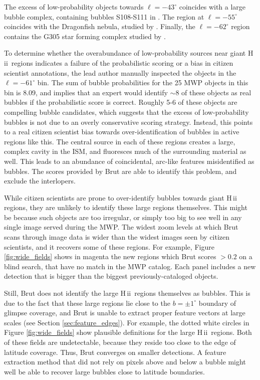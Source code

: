 \documentclass[preprint]{aastex}
\newcommand{\hii}[0]{{\sc H\,ii}}
\begin{document}
The excess of low-probability objects towards $\ell=-43^\circ$ coincides with a large bubble complex, containing bubbles S108-S111 in \cite{Churchwell06}. The region at $\ell=-55^\circ$ coincides with the Dragonfish nebula, studied by \cite{Rahman11}. Finally, the $\ell=-62^\circ$ region contains the G305 star forming complex studied by \cite{Hindson12}.

To determine whether the overabundance of low-probability sources near giant \hii\, regions indicates a failure of the probabilistic scoring or a bias in citizen scientist annotations, the lead author manually inspected the objects in the $\ell=-61^\circ$ bin. The sum of bubble probabilities for the 25 MWP objects in this bin is 8.09, and implies that an expert would identify $\sim 8$ of these objects as real bubbles if the probabilistic score is correct. Roughly 5-6 of these objects are compelling bubble candidates, which suggests that the excess of low-probability bubbles is not due to an overly conservative scoring strategy. Instead, this points to a real citizen scientist bias towards over-identification of bubbles in active regions like this. The central source in each of these regions creates a large, complex cavity in the ISM, and fluoresces much of the surrounding material as well. This leads to an abundance of coincidental, arc-like features misidentified as bubbles. The scores provided by Brut are able to identify this problem, and exclude the interlopers.

While citizen scientists are prone to over-identify bubbles towards giant \hii\, regions, they are unlikely to identify these large regions themselves. This might be because such objects are too irregular, or simply too big to see well in any single image served during the MWP. The widest zoom levels at which Brut scans through image data is wider than the widest images seen by citizen scientists, and it recovers some of these regions. For example, Figure \ref{fig:wide_fields} shows in magenta the new regions which Brut scores $>0.2$ on a blind search, that have no match in the MWP catalog. Each panel includes a new detection that is bigger than the biggest previously-cataloged objects. 

Still, Brut does not identify the large \hii\, regions themselves as bubbles. This is due to the fact that these large regions lie close to the $b = \pm 1^\circ$  boundary of {\sc glimpse} coverage, and Brut is unable to extract proper feature vectors at large scales (see Section \ref{sec:feature_edges}). For example, the dotted white circles in Figure \ref{fig:wide_fields} show plausible definitions for the large \hii\, regions. Both of these fields are undetectable, because they reside too close to the edge of latitude coverage. Thus, Brut converges on smaller detections. A feature extraction method that did not rely on pixels above and below a bubble might well be able to recover large bubbles close to latitude boundaries. 
\end{document}

